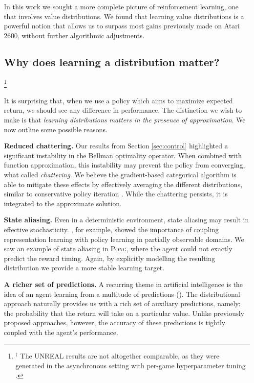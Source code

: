 \documentclass{article}
\newcommand\blfootnote[1]{%
  \begingroup
  \renewcommand\thefootnote{}\footnote{#1}%
  \addtocounter{footnote}{-1}%
  \endgroup
}
\begin{document}
In this work we sought a more complete picture of reinforcement learning, one that involves value distributions.
We found that learning value distributions is a powerful notion that allows us to surpass most gains previously made on Atari 2600, without further algorithmic adjustments.
%

\subsection{Why does learning a distribution matter?}
\blfootnote{$^\dagger$ The UNREAL results are not altogether comparable, as they were generated in the asynchronous setting with per-game hyperparameter tuning \citep{jaderberg17reinforcement}.}
%
It is surprising that, when we use a policy which aims to maximize expected return, we should see any difference in performance. The distinction we wish to make is that \emph{learning distributions matters in the presence of approximation}. We now outline some possible reasons.

\textbf{Reduced chattering.} Our results from Section \ref{sec:control} highlighted a significant instability in the Bellman optimality operator. When combined with function approximation, this instability may prevent the policy from converging, what \citet{gordon95stable} called \emph{chattering}. We believe the gradient-based categorical algorithm is able to mitigate these effects by effectively averaging the different distributions, similar to conservative policy iteration \citep{kakade02approximately}. While the chattering persists, it is integrated to the approximate solution.

\textbf{State aliasing.} Even in a deterministic environment, state aliasing may result in effective stochasticity.
%
\citet{mccallum95reinforcement}, for example, showed the importance of coupling representation learning with policy learning in partially observable domains. We saw an example of state aliasing in \textsc{Pong}, where the agent could not exactly predict the reward timing. Again, by explicitly modelling the resulting distribution we provide a more stable learning target.

\textbf{A richer set of predictions.} A recurring theme in artificial intelligence is the idea of an agent learning from a multitude of predictions (\citealt{caruana97multitask,utgoff02many,sutton11horde,jaderberg17reinforcement}). The distributional approach naturally provides us with a rich set of auxiliary predictions, namely: the probability that the return will take on a particular value. Unlike previously proposed approaches, however, the accuracy of these predictions is tightly coupled with the agent's performance.
\end{document}
